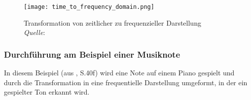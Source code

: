 







%
\begin{figure}[h]
    \texttt{[image: time\_to\_frequency\_domain.png]}
    \caption{Transformation von zeitlicher zu frequenzieller Darstellung\\\hspace{\textwidth}\textit{Quelle}: \cite{music_extraction}}
    \label{fig:frequency_to_time}
\end{figure}
%

\subsubsection{Durchführung am Beispiel einer Musiknote}

In diesem Beispiel (aus \cite{fundamentals_of_music_processing}, S.40f) wird eine Note auf einem Piano gespielt und durch die Transformation in eine frequentielle Darstellung umgeformt, in der ein gespielter Ton erkannt wird.

\par

